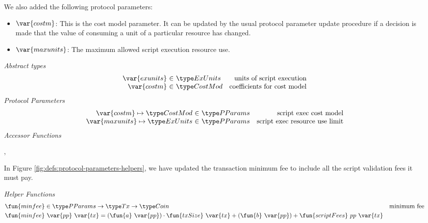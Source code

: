 We also added the following protocol parameters:

\begin{itemize}
  \item $\var{costm}$: This is the cost model parameter. It can be updated by
  the usual protocol parameter update procedure if a decision is made that
  the value of consuming a unit of a particular resource has changed.

  \item $\var{maxunits}$: The maximum allowed script execution resource use.
\end{itemize}


\begin{figure*}[htb]
  \emph{Abstract types}
  \begin{equation*}
    \begin{array}{r@{~\in~}lr}
      \var{exunits} & \ExUnits & \text{units of script execution} \\
      \var{costm} & \CostMod & \text{coefficients for cost model} \\
    \end{array}
  \end{equation*}
  \emph{Protocol Parameters}
  \begin{equation*}
      \begin{array}{r@{~\in~}lr}
        \var{costm} \mapsto \CostMod & \PParams & \text{script exec cost model}\\
        \var{maxunits} \mapsto \ExUnits & \PParams & \text{script exec resource use limit}\\
      \end{array}
  \end{equation*}
  \emph{Accessor Functions}
  \begin{center}
    ,
  \end{center}
  \caption{Definitions Used in Protocol Parameters}
  \label{fig:defs:protocol-parameters}
\end{figure*}

In Figure \ref{fig:defs:protocol-parameters-helpers}, we have updated the
transaction minimum fee to include all the script validation fees it must pay.

\begin{figure*}[htb]
  \emph{Helper Functions}
  \begin{align*}
    \fun{minfee} & \in \PParams \to \Tx \to \Coin & \text{minimum fee}\\
    \fun{minfee} & ~\var{pp}~\var{tx} =
    (\fun{a}~\var{pp}) \cdot \fun{txSize}~\var{tx} + (\fun{b}~\var{pp})
    + \fun{scriptFees}~{pp}~\var{tx}  
  \end{align*}
  \caption{Helper functions for the Protocol Parameters}
  \label{fig:defs:protocol-parameters-helpers}
\end{figure*}

\clearpage
